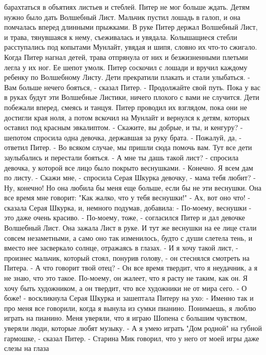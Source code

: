 барахтаться в объятиях листьев и стеблей. Питер не мог больше ждать. 
Детям нужно было дать Волшебный Лист. Мальчик пустил лошадь в галоп, и 
она помчалась вперед длинными прыжками. В руке Питер держал Волшебный 
Лист, и трава, тянувшаяся к нему, съеживалась и увядала. Колышащиеся 
стебли расступались под копытами Мунлайт, увядая и шипя, словно их 
что-то сжигало.
    Когда Питер нагнал детей, трава отпрянула от них и безжизненными 
плетьми легла у их ног. Ее шепот умолк.
    Питер соскочил с лошади и вручил каждому ребенку по Волшебному 
Листу. Дети прекратили плакать и стали улыбаться.
    - Вам больше нечего бояться, - сказал Питер. - Продолжайте свой 
путь. Пока у вас в руках будут эти Волшебные Листики, ничего плохого с 
вами не случится.
    Дети побежали вперед, смеясь и танцуя. Питер проводил их взглядом, 
пока они не достигли края ноля, а потом вскочил на Мунлайт и вернулся 
к детям, которых оставил под красным эвкалиптом.
    - Скажите, вы добрые, и ты, и кенгуру? - шепотом спросила одна 
девочка, державшая за руку брата.
    - Пожалуй, да, - ответил Питер. - Во всяком случае, мы пришли сюда 
помочь вам.
    Тут все дети заулыбались и перестали бояться.
    - А мне ты дашь такой лист? - спросила девочка, у которой все лицо 
было покрыто веснушками.
    - Конечно. Я всем дам по листу.
    - Скажи мне, - спросила Серая Шкурка девочку, - мама тебя любит?
    - Ну, конечно! Но она любила бы меня еще больше, если бы не эти 
веснушки. Она все время мне говорит: "Как жалко, что у тебя веснушки!"
    - Ах, вот оно что! - сказала Серая Шкурка, и, немного подумав, 
добавила: - По-моему, веснушки - это даже очень красиво.
    - По-моему, тоже, - согласился Питер и дал девочке Волшебный Лист.
    Она зажала Лист в руке. И тут же веснушки на ее лице стали совсем 
незаметными, а само оно так изменилось, будто с души слетела тень, и 
вместо нее засверкало солнце, отражаясь в глазах.
    - И я хочу такой лист, - произнес мальчик, который стоял, понурив 
голову, - он стеснялся смотреть на Питера.
    - А что говорит твой отец?
    - Он все время твердит, что я неудачник, а я не знаю, что это 
такое. По-моему, он жалеет, что я расту не таким, как он. Я хочу быть 
художником, а он твердит, что все художники не от мира сего.
    - О боже! - воскликнула Серая Шкурка и зашептала Питеру на ухо: - 
Именно так и про меня все говорили, когда я вынула из сумки пианино. 
Понимаешь, я люблю играть на пианино. Меня уверяли, что я играю Шопена 
с большим чувством, уверяли люди, которые любят музыку.
    - А я умею играть "Дом родной" на губной гармошке, - сказал Питер. 
- Старина Мик говорил, что у него от моей игры даже слезы на глаза 
